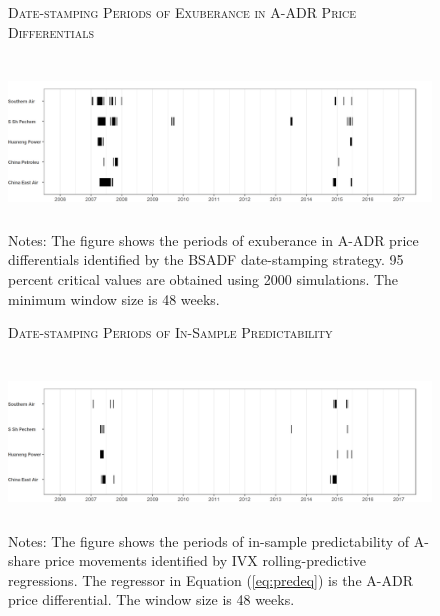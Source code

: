 \documentclass[11pt]{article}
\begin{document}
\begin{figure}[!t]
     \caption{\textsc{Date-stamping Periods of Exuberance in A-ADR Price Differentials}}
    \centering
    \includegraphics[width = \textwidth,height=4.5cm]{concordance-AADR.png}
    \caption*{\scriptsize Notes: The figure shows the periods of exuberance in A-ADR price differentials identified by the BSADF date-stamping strategy. 95 percent critical values are obtained using 2000 simulations. The minimum window size is 48 weeks.}
    \label{fig:datestamp-ADR}
\end{figure}


\begin{figure}[!t]
    \caption{ \textsc{Date-stamping Periods of In-Sample Predictability}}
    \centering
    \includegraphics[width=\textwidth,height=4.5cm]{pred-AADR.png}
    \caption*{\scriptsize Notes: The figure shows the periods of in-sample predictability of A-share price movements identified by IVX rolling-predictive regressions. The regressor in Equation (\ref{eq:predeq}) is the A-ADR price differential. The window size is 48 weeks.} 
    \label{fig:pred-ADR}
\end{figure}
\end{document}
